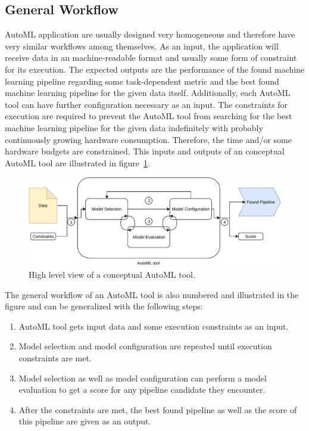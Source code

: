 \subsection{General Workflow}
\label{sec:theory:automl:workflow}
AutoML application are usually designed very homogeneous and therefore have very similar workflows among themselves.
As an input, the application will receive data in an machine-readable format and usually some form of constraint for its execution.
The expected outputs are the performance of the found machine learning pipeline regarding some task-dependent metric and the best found machine learning pipeline for the given data itself.
Additionally, each AutoML tool can have further configuration necessary as an input.\newline
The constraints for execution are required to prevent the AutoML tool from searching for the best machine learning pipeline for the given data indefinitely with probably continuously growing hardware consumption.
Therefore, the time and/or some hardware budgets are constrained.
This inputs and outputs of an conceptual AutoML tool are illustrated in figure~\ref{fig:theory:conceptualAutoMLTool}.\newline
\begin{figure}[ht!]
    \centering
    \includegraphics[width=\textwidth]{gfx/Figures/Theory/AutoMLTool.pdf}
    \caption{High level view of a conceptual AutoML tool. }
	\label{fig:theory:conceptualAutoMLTool}
\end{figure}
The general workflow of an AutoML tool is also numbered and illustrated in the figure and can be generalized with the following steps:
\begin{enumerate}
    \item AutoML tool gets input data and some execution constraints as an input.
    \item Model selection and model configuration are repeated until execution constraints are met.
    \item Model selection as well as model configuration can perform a model evaluation to get a score for any pipeline candidate they encounter.
    \item After the constraints are met, the best found pipeline as well as the score of this pipeline are given as an output.
\end{enumerate}
